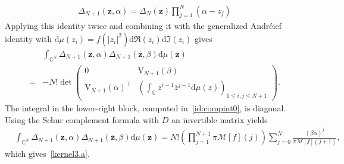 \documentclass[pdflatex,sn-mathphys-num]{sn-jnl}
\theoremstyle{thmstyleone}
\numberwithin{equation}{section}
\newcommand{\C}{\mathbb{C}}
\begin{document}
\begin{appendices}
\begin{align}\label{eq:vandermonde}
    \Delta_{N+1}\left(\textbf{z},\alpha\right)=\Delta_{N}\left(\textbf{z}\right)\prod\limits_{j=1}^{N}\left( \alpha-z_{j} \right)
\end{align}
Applying this identity twice and combining it with the generalized Andr\'eief identity with $\mathrm{d}\mu\left(z_{i}\right)=f\left( \left| z_{i} \right|^{2} \right)\mathrm{d}\Re\left( z_{i} \right)\mathrm{d}\Im\left( z_{i} \right)$ gives
    \begin{equation}
    \begin{split}
        &\int_{\C^{N}}^{}\Delta_{N+1}\left( \textbf{z},\alpha \right)\Delta_{N+1}\left( \overline{\textbf{z}},\beta \right)\mathrm{d}\mu\left( \mathbf{z} \right)\\
        =&-N!\det\left(\begin{array}{c|c}
0 & \mathrm{V}_{N+1}\left( \beta \right) \\\hline
\mathrm{V}_{N+1}\left( \alpha \right)^{\top} & \left(\int_{\C}z^{i-1}\overline{z}^{j-1}\mathrm{d}\mu(z) \right)_{1\leq i,j\leq N+1}
\end{array}\right).
    \end{split}
    \end{equation}
The integral in the lower-right block, computed in~\eqref{id:compint0}, is diagonal. Using the Schur complement formula with $D$ an invertible matrix yields
    \begin{equation}
    \begin{split}
        &\int_{\C^{N}}^{}\Delta_{N+1}\left( \textbf{z},\alpha \right)\Delta_{N+1}\left( \overline{\textbf{z}},\beta \right)\mathrm{d}\mu\left( \mathbf{z} \right)=N!\left(\prod_{j=1}^{N+1}\pi\mathcal{M}[f](j)\right)\sum_{j=0}^N\frac{(\beta\alpha)^j}{\pi\mathcal{M}[f](j+1)},
    \end{split}
    \end{equation}
which gives~\eqref{kernel3.a}.


\end{appendices}
\end{document}
